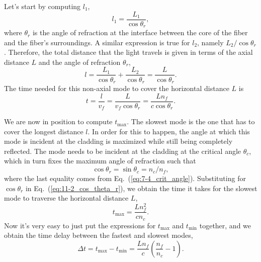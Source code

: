 Let's start by computing $l_1$,
\begin{equation}
    l_1=\frac{L_1}{\cos \theta_r},
\end{equation}
where $\theta_r$ is the angle of refraction at the interface between the core of the fiber and the fiber's surroundings.
A similar expression is true for $l_2$, namely $L_2 / \cos \theta_r$.
Therefore, the total distance that the light travels is given in terms of the axial distance $L$ and the angle of refraction $\theta_r$,
\begin{equation}
    l=\frac{L_1}{\cos \theta_r}+\frac{L_2}{\cos \theta_r}=\frac{L}{\cos \theta_r}.
\end{equation}
The time needed for this non-axial mode to cover the horizontal distance $L$ is
\begin{equation}
    t = \frac{l}{v_f} = \frac{L}{v_f \cos \theta_r} = \frac{L n_f}{c \cos \theta_r}.
    \label{eq:11-2_time_nonaxial}
\end{equation}

We are now in position to compute $t_{\max}$.
The slowest mode is the one that has to cover the longest distance $l$.
In order for this to happen, the angle at which this mode is incident at the cladding is maximized while still being completely reflected.
The mode needs to be incident at the cladding at the critical angle $\theta_c$, which in turn fixes the maximum angle of refraction such that
\begin{equation}
    \cos\theta_r = \sin\theta_c = n_c / n_f,
    \label{eq:11-2_cos_theta_r}
\end{equation}
where the last equality comes from Eq.~(\ref{eq:7-4_crit_angle}).
Substituting for $\cos\theta_r$ in Eq.~(\ref{eq:11-2_cos_theta_r}), we obtain the time it takes for the slowest mode to traverse the horizontal distance $L$,
\begin{equation}
    t_{\max }=\frac{L n_f^2}{c n_c}.
\end{equation}
Now it's very easy to just put the expressions for $t_{\mathrm{max}}$ and $t_{\mathrm{min}}$ together, and we obtain the time delay between the fastest and slowest modes, 
\begin{equation}
    \Delta t = t_{\max} - t_{\min} = \frac{L n_f}{c}\left(\frac{n_f}{n_c}-1\right).
    \label{eq:11-2_time_delay}
\end{equation}

